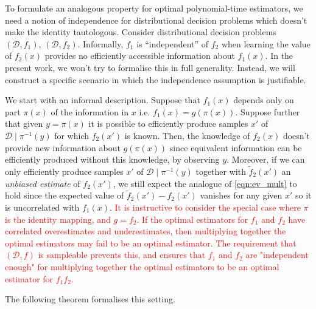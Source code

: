 \documentclass[11pt]{article}
\numberwithin{equation}{section}
\theoremstyle{definition}
\theoremstyle{plain}
\newcommand{\Dist}{\mathcal{D}}
\begin{document}
To formulate an analogous property for optimal polynomial-time estimators, we need a notion of independence for distributional decision problems which doesn't make the identity tautologous. Consider distributional decision problems $(\Dist, f_1)$, $(\Dist, f_2)$. Informally, $f_1$ is \enquote{independent} of $f_2$ when learning the value of $f_2(x)$ provides no efficiently accessible information about $f_1(x)$. In the present work, we won't try to formalise this in full generality. Instead, we will construct a specific scenario in which the independence assumption is justifiable.

We start with an informal description. Suppose that $f_1(x)$ depends only on part $\pi(x)$ of the information in $x$ i.e. $f_1(x) = g(\pi(x))$. Suppose further that given $y=\pi(x)$ it is possible to efficiently produce samples $x'$ of $\Dist \mid \pi^{-1}(y)$ for which $f_2(x')$ is known. Then, the knowledge of $f_2(x)$ doesn't provide new information about $g(\pi(x))$ since equivalent information can be efficiently produced without this knowledge, by observing $y$.
 Moreover, if we can only efficiently produce samples $x'$ of $\Dist \mid \pi^{-1}(y)$ together with $\tilde{f}_2(x')$ an \emph{unbiased estimate} of $f_2(x')$, we still expect the analogue of \ref{eqn:ev_mult} to hold since the expected value of $\tilde{f}_2(x') - f_2(x')$ vanishes for any given $x'$ so it is uncorrelated with $f_1(x)$.
 \textcolor{red}{It is instructive to consider the special case where $\pi$ is the identity mapping, and $g=f_{2}$. If the optimal estimators for $f_{1}$ and $f_{2}$ have correlated overestimates and underestimates, then multiplying together the optimal estimators may fail to be an optimal estimator. The requirement that $(\Dist,f)$ is sampleable prevents this, and ensures that $f_{1}$ and $f_{2}$ are "independent enough" for multiplying together the optimal estimators to be an optimal estimator for $f_{1}f_{2}$.}
 
The following theorem formalises this setting.
\end{document}
